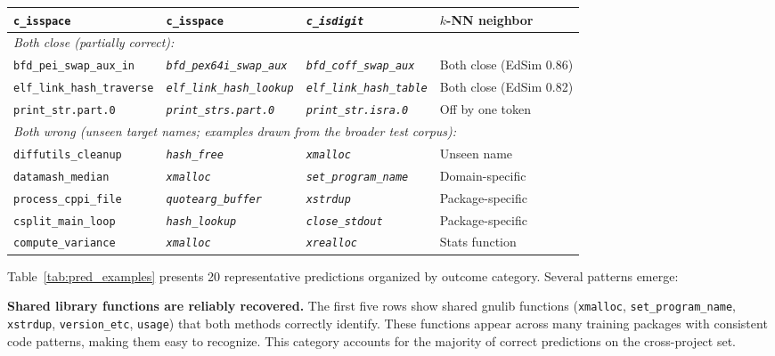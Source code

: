 \documentclass[sigconf,nonacm]{acmart}
\begin{document}
\begin{table}[t]
{\begin{tabular}{llll}
        \texttt{c\_isspace} & \textbf{\texttt{c\_isspace}} & \textit{\texttt{c\_isdigit}} & $k$-NN neighbor \\
        \midrule
        \multicolumn{4}{l}{\textit{Both close (partially correct):}} \\
        \texttt{bfd\_pei\_swap\_aux\_in} & \textit{\texttt{bfd\_pex64i\_swap\_aux}} & \textit{\texttt{bfd\_coff\_swap\_aux}} & Both close (EdSim 0.86) \\
        \texttt{elf\_link\_hash\_traverse} & \textit{\texttt{elf\_link\_hash\_lookup}} & \textit{\texttt{elf\_link\_hash\_table}} & Both close (EdSim 0.82) \\
        \texttt{print\_str.part.0} & \textit{\texttt{print\_strs.part.0}} & \textit{\texttt{print\_str.isra.0}} & Off by one token \\
        \midrule
        \multicolumn{4}{l}{\textit{Both wrong (unseen target names; examples drawn from the broader test corpus):}} \\
        \texttt{diffutils\_cleanup} & \textit{\texttt{hash\_free}} & \textit{\texttt{xmalloc}} & Unseen name \\
        \texttt{datamash\_median} & \textit{\texttt{xmalloc}} & \textit{\texttt{set\_program\_name}} & Domain-specific \\
        \texttt{process\_cppi\_file} & \textit{\texttt{quotearg\_buffer}} & \textit{\texttt{xstrdup}} & Package-specific \\
        \texttt{csplit\_main\_loop} & \textit{\texttt{hash\_lookup}} & \textit{\texttt{close\_stdout}} & Package-specific \\
        \texttt{compute\_variance} & \textit{\texttt{xmalloc}} & \textit{\texttt{xrealloc}} & Stats function \\
        \bottomrule
    \end{tabular}%
    }
\end{table}

Table~\ref{tab:pred_examples} presents 20 representative predictions organized by outcome category. Several patterns emerge:

\textbf{Shared library functions are reliably recovered.} The first five rows show shared gnulib functions (\texttt{xmalloc}, \texttt{set\_program\_name}, \texttt{xstrdup}, \texttt{version\_etc}, \texttt{usage}) that both methods correctly identify. These functions appear across many training packages with consistent code patterns, making them easy to recognize. This category accounts for the majority of correct predictions on the cross-project set.
\end{document}
